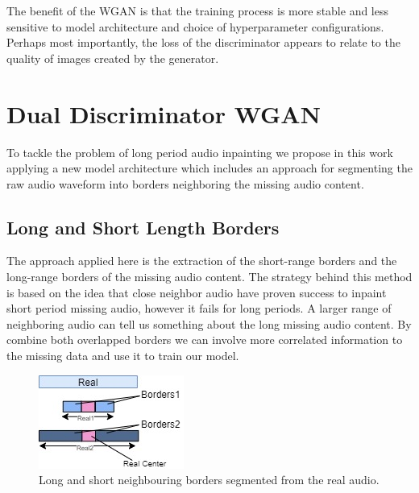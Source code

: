\documentclass{article} %
\begin{document}
The benefit of the WGAN is that the training process is more stable and less sensitive to model architecture and choice of hyperparameter configurations. Perhaps most importantly, the loss of the discriminator appears to relate to the quality of images created by the generator.

\section{Dual Discriminator WGAN}
To tackle the problem of long period audio inpainting we propose in this work applying a new model architecture which includes an approach for segmenting the raw audio waveform into borders neighboring the missing audio content.

\subsection{Long and Short Length Borders}


The approach applied here is the extraction of the short-range borders and the long-range borders of the missing audio content. The strategy behind this method is based on the idea that close neighbor audio have proven success to inpaint short period missing audio, however it fails for long periods. A larger range of neighboring audio can tell us something about the long missing audio content. By combine both overlapped borders we can involve more correlated information to the missing data and use it to train our model.

\begin{figure}[h]
    \includegraphics[scale=0.8]{images/borders.jpg}
    \centering
    \caption{Long and short neighbouring borders segmented from the real audio.}
    \label{fig:borders}
\end{figure}
\end{document}
